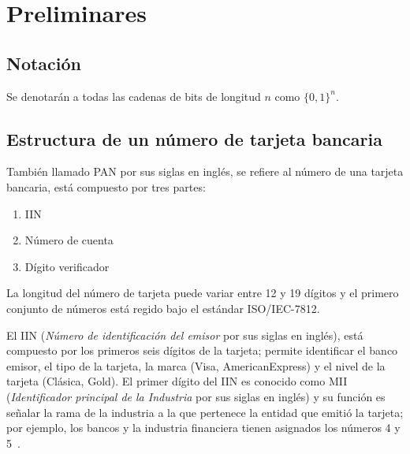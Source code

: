 %
%

\section{Preliminares}


\subsection{Notación}


Se denotarán a todas las cadenas de bits de longitud $ n $ como $ \{ 0, 1 \}^n $.

\subsection{Estructura de un número de tarjeta bancaria}
También llamado PAN por sus siglas en inglés, se refiere al número de una
tarjeta bancaria, está compuesto por tres partes:

\begin{enumerate}
  \item IIN
  \item Número de cuenta
  \item Dígito verificador
\end{enumerate}

La longitud del número de tarjeta puede variar entre 12 y 19 dígitos y el
primero conjunto de números está regido bajo el estándar ISO/IEC-7812.

El IIN (\textit{Número de identificación del emisor} por sus siglas en
inglés), está compuesto por los primeros seis dígitos de la tarjeta; permite
identificar el banco emisor, el tipo de la tarjeta, la marca (Visa,
AmericanExpress) y el nivel de la tarjeta (Clásica, Gold).  El primer dígito
del IIN es conocido como MII (\textit{Identificador principal de la Industria}
por sus siglas en inglés) y su función es señalar la rama de la industria a la
que pertenece la entidad que emitió la tarjeta; por ejemplo, los bancos y la
industria financiera tienen asignados los números 4 y 5~\cite{iso_7812}.


